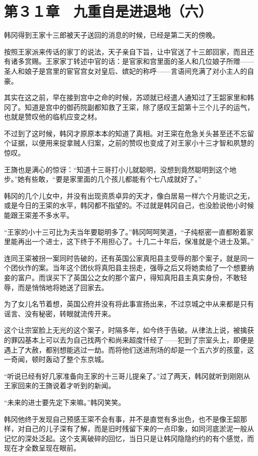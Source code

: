 \section{第３１章　九重自是进退地（六）}

韩冈得到王家十三郎被天子送回的消息的时候，已经是第二天的傍晚。

按照王家派来传话的家丁的说法，天子亲自下旨，让中官送了十三郎回家，而且还有诸多赏赐。王家家丁转述中官的话：是官家和宫里面的圣人和几位娘子所赠——圣人和娘子是宫里的宦官宫女对皇后、嫔妃的称呼——言语间充满了对小主人的自豪。

其实在这之前，早在接到宫中之命的时候，苏颂就已经遣人通知过了王韶家里和韩冈了。知道是宫中的御药院副都知救了王寀，除了感叹王韶第十三个儿子的运气，也就是赞叹他的临机应变之材。

不过到了这时候，韩冈才原原本本的知道了真相。对王寀在危急关头甚至还不忘留个证据，以便用来捉拿贼人归案，之前的赞叹也变成了对王家小十三才智和夙慧的惊叹。

王旖也是满心的惊讶：“知道十三哥打小儿就聪明，没想到竟然聪明到这个地步。”她有些敢，“要是家里面的几个孩儿都能有个七八成就好了。”

韩冈的几个儿女中，并没有出现资质卓异的天才，像白居易一样六个月能识之无，或是今日的王寀的水平，韩冈都不指望的。不过就是韩冈自己，也没脸说他小时候能跟王寀差不多水平。

“王家的小十三可比为夫当年要聪明多了。”韩冈呵呵笑道，“子纯枢密一直都盼着家里能再出一个进士，这下终于不用担心了。十几二十年后，保准就是个进士及第。”

连同王寀被拐一案同时告破的，还有英国公家真阳县主受辱的那个案子，就是同一个团伙作的案。当年这个团伙将真阳县主拐走，强辱之后又将她卖给了一个想要纳妾的富户。而误买下了英国公之女的那个富户，得知真阳县主真实身份，不敢轻辱，而是悄悄地将她送了回家去。

为了女儿名节着想，英国公府并没有将此事宣扬出来，不过京城之中从来都是只有谣言、没有秘密，转眼就流传开来。

这个让宗室脸上无光的这个案子，时隔多年，如今终于告破。从律法上说，被擒获的罪囚基本上可以去为自己找两个和尚来超度忏经了——犯到了宗室头上，即便是遇上了大赦，都别想能逃过一劫。而将他们送进刑场的却是一个五六岁的孩童，这一奇闻，顿时轰动了整个东京城。

“听说已经有好几家准备向王家的十三哥儿提亲了。”过了两天，韩冈就听到刚刚从王家回来的王旖说着才听到的新闻。

“未来的进士要先定下来嘛。”韩冈笑笑。

韩冈他终于发现自己预感王寀不会有事，并不是直觉有多出色，也不是像王韶那样，对自己的儿子深有了解，而是旧时残留下来的一点印象，如同河底淤泥一般从记忆的深处泛起。这个支离破碎的回忆，当日只是让韩冈隐隐约约的有个感觉，而现在才全数呈现在眼前。

